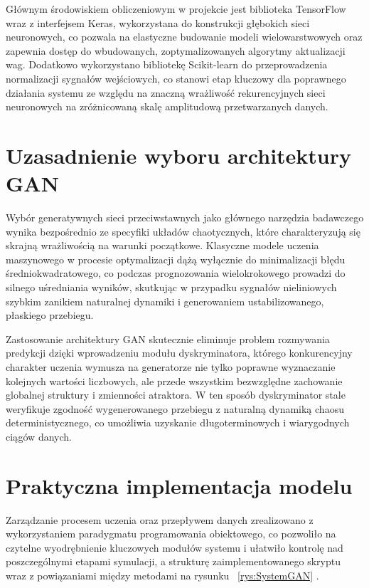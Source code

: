 Głównym środowiskiem obliczeniowym w projekcie jest biblioteka TensorFlow wraz z interfejsem Keras, wykorzystana do konstrukcji głębokich sieci neuronowych, co pozwala na elastyczne budowanie modeli wielowarstwowych oraz zapewnia dostęp do wbudowanych, zoptymalizowanych algorytmy aktualizacji wag. Dodatkowo wykorzystano bibliotekę Scikit-learn do przeprowadzenia normalizacji sygnałów wejściowych, co stanowi etap kluczowy dla poprawnego działania systemu ze względu na znaczną wrażliwość rekurencyjnych sieci neuronowych na zróżnicowaną skalę amplitudową przetwarzanych danych.
 
\section{Uzasadnienie wyboru architektury GAN}
 
Wybór generatywnych sieci przeciwstawnych jako głównego narzędzia badawczego wynika bezpośrednio ze specyfiki układów chaotycznych, które charakteryzują się skrajną wrażliwością na warunki początkowe. Klasyczne modele uczenia maszynowego w procesie optymalizacji dążą wyłącznie do minimalizacji błędu średniokwadratowego, co podczas prognozowania wielokrokowego prowadzi do silnego uśredniania wyników, skutkując w przypadku sygnałów nieliniowych szybkim zanikiem naturalnej dynamiki i generowaniem ustabilizowanego, płaskiego przebiegu.
 
Zastosowanie architektury GAN skutecznie eliminuje problem rozmywania predykcji dzięki wprowadzeniu modułu dyskryminatora, którego konkurencyjny charakter uczenia wymusza na generatorze nie tylko poprawne wyznaczanie kolejnych wartości liczbowych, ale przede wszystkim bezwzględne zachowanie globalnej struktury i zmienności atraktora. W ten sposób dyskryminator stale weryfikuje zgodność wygenerowanego przebiegu z naturalną dynamiką chaosu deterministycznego, co umożliwia uzyskanie długoterminowych i wiarygodnych ciągów danych.
 
\section{Praktyczna implementacja modelu}
 
Zarządzanie procesem uczenia oraz przepływem danych zrealizowano z wykorzystaniem 
paradygmatu programowania obiektowego, co pozwoliło na czytelne wyodrębnienie 
kluczowych modułów systemu i ułatwiło kontrolę nad poszczególnymi etapami 
symulacji, a strukturę zaimplementowanego skryptu wraz z powiązaniami między 
metodami na rysunku ~\ref{rys:SystemGAN} .
 
